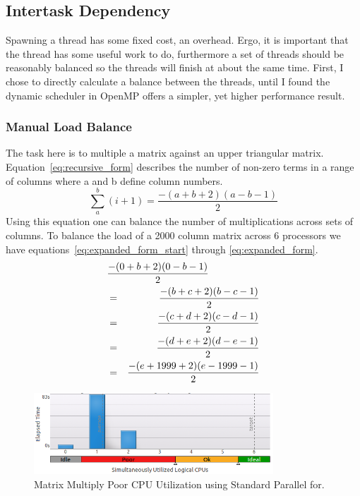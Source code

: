 \documentclass[10pt]{article}
\begin{document}
\subsection{Intertask Dependency}
Spawning a thread has some fixed cost, an overhead.  Ergo, it is important that the thread has some 
useful work to do, furthermore a set of threads should be reasonably balanced so the threads will 
finish at about the same time.  First, I chose to directly calculate a balance between the threads,
until I found the dynamic scheduler in OpenMP offers a simpler, yet higher performance result.

\subsubsection{Manual Load Balance}

The task here is to multiple a matrix against an upper triangular matrix.  Equation~\ref{eq:recursive_form}
describes the number of non-zero terms in a range of columns where a and b define column numbers.  
\begin{equation}
\sum\limits_{a}^b (i + 1) = \frac{-(a + b + 2)(a - b -1)}{2}
\label{eq:recursive_form}
\end{equation}
Using this equation one can balance the number of 
multiplications across sets of columns.  To balance the load of a 2000 column matrix 
across 6 processors we have equations~\ref{eq:expanded_form_start} through \ref{eq:expanded_form}.
\begin{eqnarray}
\label{eq:expanded_form_start}
\lefteqn{\frac{-(0 + b + 2)(0 - b -1)}{2}} \\
& = & \frac{-(b + c + 2)(b - c -1)}{2} \\
& = & \frac{-(c + d + 2)(c - d -1)}{2} \\
& = & \frac{-(d + e + 2)(d - e -1)}{2} \\
& = & \frac{-(e + 1999 + 2)(e - 1999 -1)}{2}
\label{eq:expanded_form}
\end{eqnarray}

\begin{figure}[h]
\begin{center}
\includegraphics[width=0.8\textwidth]{figures/matrix_without_dynamic_schedule_cpu_usage.png}
\caption{Matrix Multiply Poor CPU Utilization using Standard Parallel for.}
\label{fig:matrix_wo_dynamic_schedule_cpu_usage}
\end{center}
\end{figure}
\end{document}
